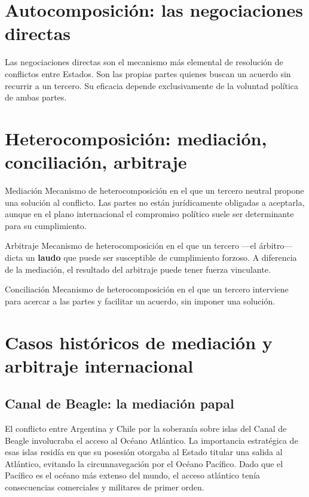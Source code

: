 \documentclass[12pt,oneside]{book}
\begin{document}
\section{Autocomposición: las negociaciones directas}

Las negociaciones directas son el mecanismo más elemental de resolución de conflictos entre Estados. Son las propias partes quienes buscan un acuerdo sin recurrir a un tercero. Su eficacia depende exclusivamente de la voluntad política de ambas partes.

\section{Heterocomposición: mediación, conciliación, arbitraje}

\begin{definition}{Mediación}
Mecanismo de heterocomposición en el que un tercero neutral propone una solución al conflicto. Las partes no están jurídicamente obligadas a aceptarla, aunque en el plano internacional el compromiso político suele ser determinante para su cumplimiento.
\end{definition}

\begin{definition}{Arbitraje}
Mecanismo de heterocomposición en el que un tercero —el árbitro— dicta un \textbf{laudo} que puede ser susceptible de cumplimiento forzoso. A diferencia de la mediación, el resultado del arbitraje puede tener fuerza vinculante.
\end{definition}

\begin{definition}{Conciliación}
Mecanismo de heterocomposición en el que un tercero interviene para acercar a las partes y facilitar un acuerdo, sin imponer una solución.
\end{definition}

\section{Casos históricos de mediación y arbitraje internacional}

\subsection{Canal de Beagle: la mediación papal}

El conflicto entre Argentina y Chile por la soberanía sobre islas del Canal de Beagle involucraba el acceso al Océano Atlántico. La importancia estratégica de esas islas residía en que su posesión otorgaba al Estado titular una salida al Atlántico, evitando la circunnavegación por el Océano Pacífico. Dado que el Pacífico es el océano más extenso del mundo, el acceso atlántico tenía consecuencias comerciales y militares de primer orden.
\end{document}
